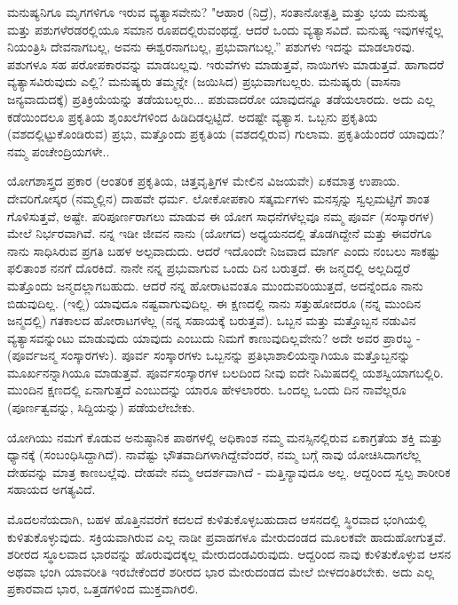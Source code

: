ಮನುಷ್ಯನಿಗೂ ಮೃಗಗಳಿಗೂ ಇರುವ ವ್ಯತ್ಯಾಸವೇನು? "ಆಹಾರ (ನಿದ್ರೆ), ಸಂತಾನೋತ್ಪತ್ತಿ ಮತ್ತು ಭಯ ಮನುಷ್ಯ ಮತ್ತು ಪಶುಗಳೆರಡರಲ್ಲಿಯೂ ಸಮಾನ ರೂಪದಲ್ಲಿರುವಂಥದ್ದೆ. ಆದರೆ ಒಂದು ವ್ಯತ್ಯಾಸವಿದೆ. ಮನುಷ್ಯ ಇವುಗಳನ್ನೆಲ್ಲ ನಿಯಂತ್ರಿಸಿ ದೇವನಾಗಬಲ್ಲ, ಅವನು ಈಶ್ವರನಾಗಬಲ್ಲ, ಪ್ರಭುವಾಗಬಲ್ಲ.'' ಪಶುಗಳು ಇದನ್ನು ಮಾಡಲಾರವು. ಪಶುಗಳೂ ಸಹ ಪರೋಪಕಾರವನ್ನು ಮಾಡಬಲ್ಲವು. ಇರುವೆಗಳು ಮಾಡುತ್ತವೆ, ನಾಯಿಗಳು ಮಾಡುತ್ತವೆ. ಹಾಗಾದರೆ ವ್ಯತ್ಯಾಸವಿರುವುದು ಎಲ್ಲಿ? ಮನುಷ್ಯರು ತಮ್ಮನ್ನೇ (ಜಯಿಸಿದ) ಪ್ರಭುವಾಗಬಲ್ಲರು. ಮನುಷ್ಯರು (ವಾಸನಾ ಜನ್ಯವಾದುದಕ್ಕೆ) ಪ್ರತಿಕ್ರಿಯೆಯನ್ನು ತಡೆಯಬಲ್ಲರು... ಪಶುವಾದರೋ ಯಾವುದನ್ನೂ ತಡೆಯಲಾರದು. ಅದು ಎಲ್ಲ ಕಡೆಯಿಂದಲೂ ಪ್ರಕೃತಿಯ ಶೃಂಖಲೆಗಳಿಂದ ಹಿಡಿದಿಡಲ್ಪಟ್ಟಿದೆ. ಅದಷ್ಟೇ ವ್ಯತ್ಯಾಸ. ಒಬ್ಬನು ಪ್ರಕೃತಿಯ (ವಶದಲ್ಲಿಟ್ಟುಕೊಂಡಿರುವ) ಪ್ರಭು, ಮತ್ತೊಂದು ಪ್ರಕೃತಿಯ (ವಶದಲ್ಲಿರುವ) ಗುಲಾಮ. ಪ್ರಕೃತಿಯೆಂದರೆ ಯಾವುದು? ನಮ್ಮ ಪಂಚೇಂದ್ರಿಯಗಳೇ..

ಯೋಗಶಾಸ್ತ್ರದ ಪ್ರಕಾರ (ಆಂತರಿಕ ಪ್ರಕೃತಿಯ, ಚಿತ್ತವೃತ್ತಿಗಳ ಮೇಲಿನ ವಿಜಯವೇ) ಏಕಮಾತ್ರ ಉಪಾಯ. ದೇವರಿಗೋಸ್ಕರ (ನಮ್ಮಲ್ಲಿನ) ದಾಹವೇ ಧರ್ಮ. ಲೋಕೋಪಕಾರಿ ಸತ್ಕರ್ಮಗಳು ಮನಸ್ಸನ್ನು ಸ್ವಲ್ಪಮಟ್ಟಿಗೆ ಶಾಂತ ಗೊಳಿಸುತ್ತವೆ, ಅಷ್ಟೇ. ಪರಿಪೂರ್ಣರಾಗಲು ಮಾಡುವ ಈ ಯೋಗ ಸಾಧನೆಗಳೆಲ್ಲವೂ ನಮ್ಮ ಪೂರ್ವ (ಸಂಸ್ಕಾರಗಳ) ಮೇಲೆ ನಿರ್ಭರವಾಗಿವೆ. ನನ್ನ ಇಡೀ ಜೀವನ ನಾನು (ಯೋಗದ) ಅಧ್ಯಯನದಲ್ಲಿ ತೊಡಗಿದ್ದೇನೆ ಮತ್ತು ಈವರೆಗೂ ನಾನು ಸಾಧಿಸಿರುವ ಪ್ರಗತಿ ಬಹಳ ಅಲ್ಪವಾದುದು. ಆದರೆ ಇದೊಂದೇ ನಿಜವಾದ ಮಾರ್ಗ ಎಂದು ನಂಬಲು ಸಾಕಷ್ಟು ಫಲಿತಾಂಶ ನನಗೆ ದೊರಕಿದೆ. ನಾನೇ ನನ್ನ ಪ್ರಭುವಾಗುವ ಒಂದು ದಿನ ಬರುತ್ತದೆ. ಈ ಜನ್ಮದಲ್ಲಿ ಅಲ್ಲದಿದ್ದರೆ ಮತ್ತೊಂದು ಜನ್ಮದಲ್ಲಾಗಬಹುದು. ಆದರೆ ನನ್ನ ಹೋರಾಟವಂತೂ ಮುಂದುವರಿಯುತ್ತದೆ, ಅದನ್ನೆಂದೂ ನಾನು ಬಿಡುವುದಿಲ್ಲ. (ಇಲ್ಲಿ) ಯಾವುದೂ ನಷ್ಟವಾಗುವುದಿಲ್ಲ. ಈ ಕ್ಷಣದಲ್ಲಿ ನಾನು ಸತ್ತುಹೋದರೂ (ನನ್ನ ಮುಂದಿನ ಜನ್ಮದಲ್ಲಿ) ಗತಕಾಲದ ಹೋರಾಟಗಳೆಲ್ಲ (ನನ್ನ ಸಹಾಯಕ್ಕೆ ಬರುತ್ತವೆ). ಒಬ್ಬನ ಮತ್ತು ಮತ್ತೊಬ್ಬನ ನಡುವಿನ ವ್ಯತ್ಯಾಸವನ್ನುಂಟು ಮಾಡುವುದು ಯಾವುದು ಎಂಬುದು ನಿಮಗೆ ಕಾಣುವುದಿಲ್ಲವೇನು? ಅದೇ ಅವರ ಪ್ರಾರಬ್ಧ - (ಪೂರ್ವಜನ್ಮ ಸಂಸ್ಕಾರಗಳು). ಪೂರ್ವ ಸಂಸ್ಕಾರಗಳು ಒಬ್ಬನನ್ನು ಪ್ರತಿಭಾಶಾಲಿಯನ್ನಾಗಿಯೂ ಮತ್ತೊಬ್ಬನನ್ನು ಮೂರ್ಖನನ್ನಾಗಿಯೂ ಮಾಡುತ್ತವೆ. ಪೂರ್ವಸಂಸ್ಕಾರಗಳ ಬಲದಿಂದ ನೀವು ಐದೇ ನಿಮಿಷದಲ್ಲಿ ಯಶಸ್ವಿಯಾಗಬಲ್ಲಿರಿ. ಮುಂದಿನ ಕ್ಷಣದಲ್ಲಿ ಏನಾಗುತ್ತದೆ ಎಂಬುದನ್ನು ಯಾರೂ ಹೇಳಲಾರರು. ಒಂದಲ್ಲ ಒಂದು ದಿನ ನಾವೆಲ್ಲರೂ (ಪೂರ್ಣತ್ವವನ್ನು, ಸಿದ್ದಿಯನ್ನು) ಪಡೆಯಲೇಬೇಕು.

ಯೋಗಿಯು ನಮಗೆ ಕೊಡುವ ಅನುಷ್ಠಾನಿಕ ಪಾಠಗಳಲ್ಲಿ ಅಧಿಕಾಂಶ ನಮ್ಮ ಮನಸ್ಸಿನಲ್ಲಿರುವ ಏಕಾಗ್ರತೆಯ ಶಕ್ತಿ ಮತ್ತು ಧ್ಯಾನಕ್ಕೆ (ಸಂಬಂಧಿಸಿದ್ದಾಗಿದೆ). ನಾವೆಷ್ಟು ಭೌತವಾದಿಗಳಾಗಿದ್ದೇವೆಂದರೆ, ನಮ್ಮ ಬಗ್ಗೆ ನಾವು ಯೋಚಿಸಿದಾಗಲೆಲ್ಲ ದೇಹವನ್ನು ಮಾತ್ರ ಕಾಣಬಲ್ಲೆವು. ದೇಹವೇ ನಮ್ಮ ಆದರ್ಶವಾಗಿದೆ - ಮತ್ತಿನ್ಯಾವುದೂ ಅಲ್ಲ. ಆದ್ದರಿಂದ ಸ್ವಲ್ಪ ಶಾರೀರಿಕ ಸಹಾಯದ ಅಗತ್ಯವಿದೆ.

ಮೊದಲನೆಯದಾಗಿ, ಬಹಳ ಹೊತ್ತಿನವರೆಗೆ ಕದಲದೆ ಕುಳಿತುಕೊಳ್ಳಬಹುದಾದ ಆಸನದಲ್ಲಿ ಸ್ಥಿರವಾದ ಭಂಗಿಯಲ್ಲಿ ಕುಳಿತುಕೊಳ್ಳುವುದು. ಸಕ್ರಿಯವಾಗಿರುವ ಎಲ್ಲ ನಾಡೀ ಪ್ರವಾಹಗಳೂ ಮೇರುದಂಡದ ಮೂಲಕವೇ ಹಾದುಹೋಗುತ್ತವೆ. ಶರೀರದ ಸ್ಥೂಲವಾದ ಭಾರವನ್ನು ಹೊರುವುದಕ್ಕಲ್ಲ ಮೇರುದಂಡವಿರುವುದು. ಆದ್ದರಿಂದ ನಾವು ಕುಳಿತುಕೊಳ್ಳುವ ಆಸನ ಅಥವಾ ಭಂಗಿ ಯಾವರೀತಿ ಇರಬೇಕೆಂದರೆ ಶರೀರದ ಭಾರ ಮೇರುದಂಡದ ಮೇಲೆ ಬೀಳದಂತಿರಬೇಕು. ಅದು ಎಲ್ಲ ಪ್ರಕಾರವಾದ ಭಾರ, ಒತ್ತಡಗಳಿಂದ ಮುಕ್ತವಾಗಿರಲಿ.

